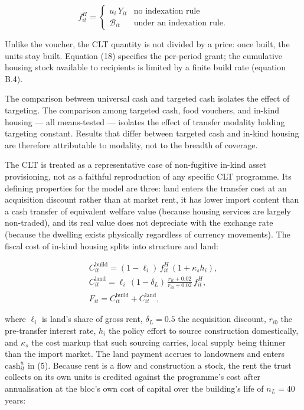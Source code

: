 \documentclass[preprint,review,12pt]{elsarticle}
\begin{document}
\[f^H_{it} = \begin{cases} u_i \, Y_{it} & \text{no indexation rule} \\ \mathcal{B}_{it} & \text{under an indexation rule.} \end{cases} \tag{18}\]

Unlike the voucher, the CLT quantity is not divided by a price: once
built, the units stay built. Equation (18) specifies the per-period
grant; the cumulative housing stock available to recipients is limited
by a finite build rate (equation B.4).

The comparison between universal cash and targeted cash isolates the
effect of targeting. The comparison among targeted cash, food vouchers,
and in-kind housing --- all means-tested --- isolates the effect of
transfer modality holding targeting constant. Results that differ
between targeted cash and in-kind housing are therefore attributable to
modality, not to the breadth of coverage.

The CLT is treated as a representative case of non-fugitive in-kind
asset provisioning, not as a faithful reproduction of any specific CLT
programme. Its defining properties for the model are three: land enters
the transfer cost at an acquisition discount rather than at market rent,
it has lower import content than a cash transfer of equivalent welfare
value (because housing services are largely non-traded), and its real
value does not depreciate with the exchange rate (because the dwelling
exists physically regardless of currency movements). The fiscal cost of
in-kind housing splits into structure and land:

\[\begin{gathered} C^{\mathrm{build}}_{it} = (1 - \ell_i) \, f^H_{it} \, (1 + \kappa_s h_i), \\ C^{\mathrm{land}}_{it} = \ell_i \, (1 - \delta_L) \, \frac{r_{it} + 0.02}{r_{i0} + 0.02} \, f^H_{it}, \\ F_{it} = C^{\mathrm{build}}_{it} + C^{\mathrm{land}}_{it}, \end{gathered} \tag{19}\]

where \(\ell_i\) is land's share of gross rent, \(\delta_L = 0.5\) the
acquisition discount, \(r_{i0}\) the pre-transfer interest rate, \(h_i\)
the policy effort to source construction domestically, and \(\kappa_s\)
the cost markup that such sourcing carries, local supply being thinner
than the import market. The land payment accrues to landowners and
enters \(\mathrm{cash}^u_{it}\) in (5). Because rent is a flow and
construction a stock, the rent the trust collects on its own units is
credited against the programme's cost after annualisation at the bloc's
own cost of capital over the building's life of \(n_L = 40\) years:
\end{document}
